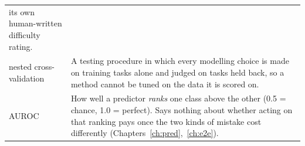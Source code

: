 {\begin{center}
\begin{tabularx}{\textwidth}{@{}lX@{}}
              its own human-written difficulty rating. \\
nested cross-validation & A testing procedure in which every modelling choice
              is made on training tasks alone and judged on tasks held back,
              so a method cannot be tuned on the data it is scored on. \\
AUROC & How well a predictor \emph{ranks} one class above the other (0.5 =
chance, 1.0 = perfect). Says nothing about whether acting on that ranking
pays once the two kinds of mistake cost differently
(Chapters~\ref{ch:pred},~\ref{ch:e2e}). \\
\bottomrule
\end{tabularx}
\end{center}

    \thispagestyle{guide}
}
\newpage

